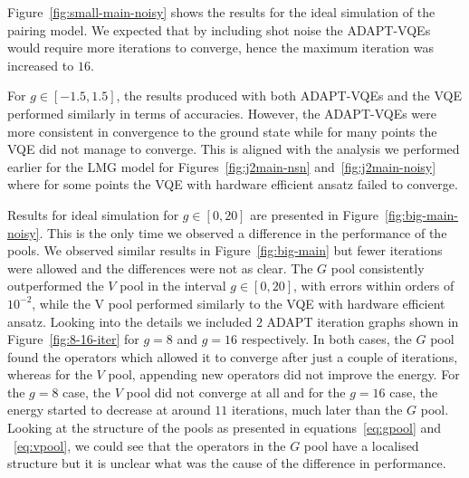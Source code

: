 Figure~\ref{fig:small-main-noisy} shows the results for the ideal simulation of the pairing model. We expected that by including shot noise the ADAPT-VQEs would require more iterations to converge, hence the maximum iteration was increased to $ 16 $.

For $ g \in [-1.5, 1.5]$, the results produced with both ADAPT-VQEs and the VQE performed similarly in terms of accuracies. However, the ADAPT-VQEs were more consistent in convergence to the ground state while for many points the VQE did not manage to converge. This is aligned with the analysis we performed earlier for the LMG model for Figures~\ref{fig:j2main-nsn} and~\ref{fig:j2main-noisy} where for some points the VQE with hardware efficient ansatz failed to converge. 

Results for ideal simulation for $ g \in [0,20] $ are presented in Figure~\ref{fig:big-main-noisy}. This is the only time we observed a difference in the performance of the pools. We observed similar results in Figure~\ref{fig:big-main} but fewer iterations were allowed and the differences were not as clear. The $ G $  pool consistently outperformed the $ V $  pool in the interval $ g \in [0,20] $, with errors within orders of $ 10^{-2} $, while the V pool performed similarly to the VQE with hardware efficient ansatz. Looking into the details we included $ 2 $ ADAPT iteration graphs shown in Figure~\ref{fig:8-16-iter} for $ g=8 $ and $ g=16 $ respectively. In both cases, the $ G $ pool found the operators which allowed it to converge after just a couple of iterations, whereas for the $ V $ pool, appending new operators did not improve the energy. For the $ g=8 $ case, the $ V $ pool did not converge at all and for the $ g=16 $ case, the energy started to decrease at around $ 11 $ iterations, much later than the $ G $ pool. Looking at the structure of the pools as presented in equations~\eqref{eq:gpool} and ~\eqref{eq:vpool}, we could see that the operators in the $ G $ pool have a localised structure but it is unclear what was the cause of the difference in performance.

